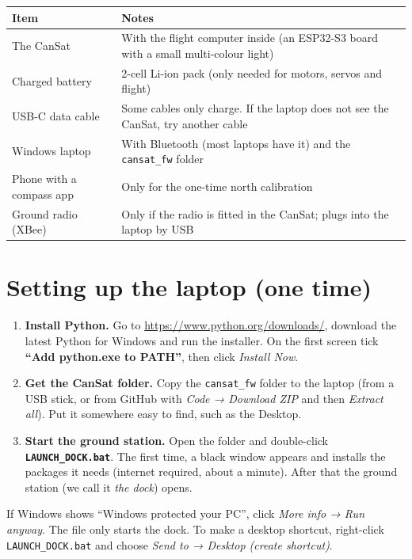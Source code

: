 \documentclass[11pt,a4paper,oneside]{article}
\begin{document}
\begin{tabularx}{\linewidth}{@{}lL@{}}
\toprule
\textbf{Item} & \textbf{Notes} \\ \midrule
The CanSat & With the flight computer inside (an ESP32-S3 board with a small multi-colour light) \\
Charged battery & 2-cell Li-ion pack (only needed for motors, servos and flight) \\
USB-C data cable & Some cables only charge. If the laptop does not see the CanSat, try another cable \\
Windows laptop & With Bluetooth (most laptops have it) and the \texttt{cansat\_fw} folder \\
Phone with a compass app & Only for the one-time north calibration \\
Ground radio (XBee) & Only if the radio is fitted in the CanSat; plugs into the laptop by USB \\
\bottomrule
\end{tabularx}

\section{Setting up the laptop (one time)}\label{sec:setup}

\begin{enumerate}
  \item \textbf{Install Python.} Go to \url{https://www.python.org/downloads/}, download the
        latest Python for Windows and run the installer. On the first screen tick
        \textbf{``Add python.exe to PATH''}, then click \emph{Install Now}.
  \item \textbf{Get the CanSat folder.} Copy the \texttt{cansat\_fw} folder to the laptop
        (from a USB stick, or from GitHub with \emph{Code → Download ZIP} and then \emph{Extract all}).
        Put it somewhere easy to find, such as the Desktop.
  \item \textbf{Start the ground station.} Open the folder and double-click
        \textbf{\texttt{LAUNCH\_DOCK.bat}}. The first time, a black window appears and installs the
        packages it needs (internet required, about a minute). After that the ground station
        (we call it \emph{the dock}) opens.
\end{enumerate}

\begin{tip}
If Windows shows ``Windows protected your PC'', click \emph{More info → Run anyway}. The file
only starts the dock. To make a desktop shortcut, right-click \texttt{LAUNCH\_DOCK.bat} and choose
\emph{Send to → Desktop (create shortcut)}.
\end{tip}
\end{document}
